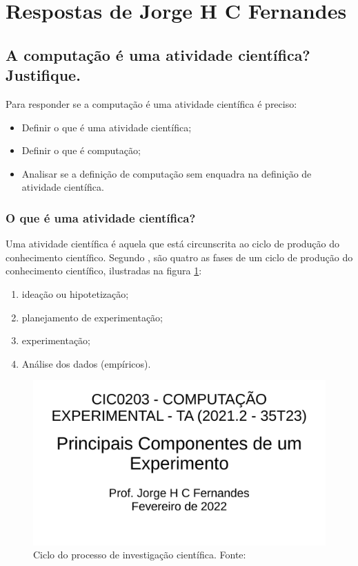 \section{Respostas de Jorge H C Fernandes\label{tarefa-jhcf-componentes-eperimento}}

\subsection{A computação é uma atividade científica? Justifique. }

Para responder se a computação é uma atividade científica é preciso:
\begin{itemize}
    \item Definir o que é uma atividade científica;
    \item Definir o que é computação;
    \item Analisar se a definição de computação sem enquadra na definição de atividade científica. 
\end{itemize}

\subsubsection{O que é uma atividade científica?} Uma atividade científica é aquela que está circunscrita ao ciclo de produção do conhecimento científico. Segundo \cite[p.2]{barton_graphical_1999}, são quatro as fases de um ciclo de produção do conhecimento científico, ilustradas na figura \ref{fig:ciclo:barton}:
\begin{enumerate}
    \item ideação ou hipotetização; 
    \item  planejamento de experimentação;
    \item  experimentação;
    \item Análise dos dados (empíricos).
\end{enumerate}

\begin{figure}
    \centering
    \includegraphics[page=31,clip=true,width=\textwidth]{3-Computacao-Experimental/aulas/3.1-Componentes-Experimento/slides-experimentos.pdf}
    \caption{Ciclo do processo de investigação científica. Fonte: \cite{barton_graphical_1999}\label{fig:ciclo:barton}}
\end{figure}

